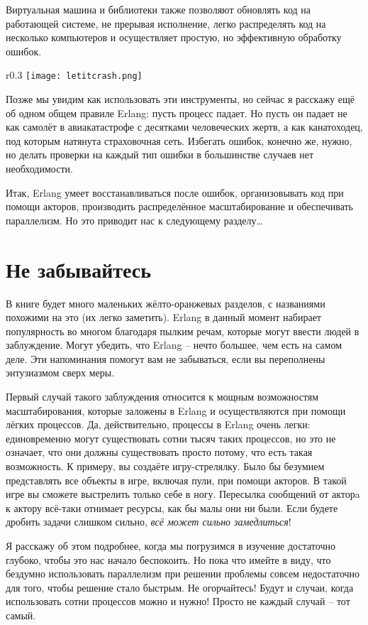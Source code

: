 Виртуальная машина и библиотеки также позволяют обновлять код на работающей системе, не прерывая исполнение, легко распределять код на несколько компьютеров и осуществляет простую, но эффективную обработку ошибок.

\begin{wrapfigure}{r}{0.3\linewidth}
    \texttt{[image: letitcrash.png]}
\end{wrapfigure}
Позже мы увидим как использовать эти инструменты, но сейчас я расскажу ещё об одном общем правиле Erlang: пусть процесс падает.
Но пусть он падает не как самолёт в авиакатастрофе с десятками человеческих жертв, а как канатоходец, под которым натянута страховочная сеть.
Избегать ошибок, конечно же, нужно, но делать проверки на каждый тип ошибки в большинстве случаев нет необходимости.

Итак, Erlang умеет восстанавливаться после ошибок, организовывать код при помощи акторов, производить распределённое масштабирование и обеспечивать параллелизм.
Но это приводит нас к следующему разделу\ldots

\section{Не забывайтесь}
В книге будет много маленьких жёлто\--оранжевых разделов, с названиями похожими на это (их легко заметить).
Erlang в данный момент набирает популярность во многом благодаря пылким речам, которые могут ввести людей в заблуждение.
Могут убедить, что Erlang \--- нечто большее, чем есть на самом деле.
Эти напоминания помогут вам не забываться, если вы переполнены энтузиазмом сверх меры.

Первый случай такого заблуждения относится к мощным возможностям масштабирования, которые заложены в Erlang и осуществляются при помощи лёгких процессов.
Да, действительно, процессы в Erlang очень легки: единовременно могут существовать сотни тысяч таких процессов, но это не означает, что они должны существовать просто потому, что есть такая возможность.
К примеру, вы создаёте игру\--стрелялку.
Было бы безумием представлять все объекты в игре, включая пули, при помощи акторов.
В такой игре вы сможете выстрелить только себе в ногу.
Пересылка сообщений от акторa к актору всё\--таки отнимает ресурсы, как бы малы они ни были.
Если будете дробить задачи слишком сильно, \emph{всё может сильно замедлиться}!

Я расскажу об этом подробнее, когда мы погрузимся в изучение достаточно глубоко, чтобы это нас начало беспокоить.
Но пока что имейте в виду, что бездумно использовать параллелизм при решении проблемы совсем недостаточно для того, чтобы решение стало быстрым.
Не огорчайтесь!
Будут и случаи, когда использовать сотни процессов можно и нужно!
Просто не каждый случай \--- тот самый.

